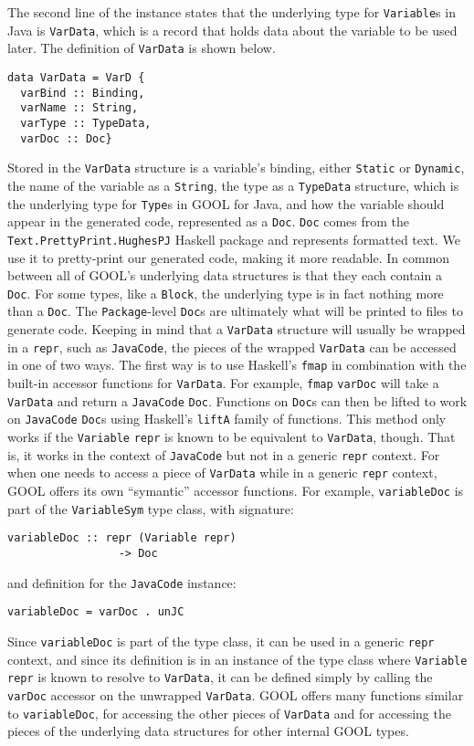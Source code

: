 \documentclass[sigplan,review,anonymous]{acmart}
\begin{document}
The second line of the instance states that the underlying type for 
\verb|Variable|s in Java is \verb|VarData|, which is a record that holds data 
about the variable to be used later. The definition of \verb|VarData| is shown 
below.
\begin{lstlisting}
data VarData = VarD {
  varBind :: Binding, 
  varName :: String, 
  varType :: TypeData, 
  varDoc :: Doc}
\end{lstlisting}
Stored in the \verb|VarData| structure is a variable's binding, either 
\verb|Static| or \verb|Dynamic|, the name of the variable as a \verb|String|, 
the type as a \verb|TypeData| structure, which is the underlying type for 
\verb|Type|s in GOOL for Java, and how the variable should appear in the 
generated code, represented as a \verb|Doc|. \verb|Doc| comes from the 
\verb|Text.PrettyPrint.HughesPJ| Haskell package and represents formatted text. 
We use it to pretty-print our generated code, making it more readable.
In common between all of GOOL's underlying data structures is that they each 
contain a \verb|Doc|. For some types, like a \verb|Block|, the underlying type 
is in fact nothing more than a \verb|Doc|. The \verb|Package|-level \verb|Doc|s 
are ultimately what will be printed to files to generate code. Keeping in mind 
that a \verb|VarData| structure will usually be wrapped in a \verb|repr|, such 
as \verb|JavaCode|, the pieces of the wrapped \verb|VarData| can be accessed in 
one of two ways. The first way is to use Haskell's \verb|fmap| in combination 
with the built-in accessor functions for \verb|VarData|. For example, 
\verb|fmap| \verb|varDoc| will take a \verb|VarData| and return a 
\verb|JavaCode| \verb|Doc|. Functions on \verb|Doc|s can then be lifted to work 
on \verb|JavaCode| \verb|Doc|s using Haskell's \verb|liftA| family of 
functions. This method only works if the \verb|Variable| \verb|repr| is known 
to be equivalent to \verb|VarData|, though. That is, it works in the context of 
\verb|JavaCode| but not in a generic \verb|repr| context. For when one needs to 
access a piece of \verb|VarData| while in a generic \verb|repr| context, GOOL 
offers its own ``symantic'' accessor functions. For example, \verb|variableDoc| 
is part of the \verb|VariableSym| type class, with signature:
\begin{lstlisting}
variableDoc :: repr (Variable repr) 
                 -> Doc
\end{lstlisting}
and definition for the \verb|JavaCode| instance:
\begin{lstlisting}
variableDoc = varDoc . unJC
\end{lstlisting}
Since \verb|variableDoc| is part of the type class, it can be used in a generic 
\verb|repr| context, and since its definition is in an instance of the type 
class where \verb|Variable| \verb|repr| is known to resolve to \verb|VarData|, 
it can be defined simply by calling the \verb|varDoc| accessor on the unwrapped 
\verb|VarData|. GOOL offers many functions similar to \verb|variableDoc|, for 
accessing the other pieces of \verb|VarData| and for accessing the pieces of 
the underlying data structures for other internal GOOL types.
\end{document}
